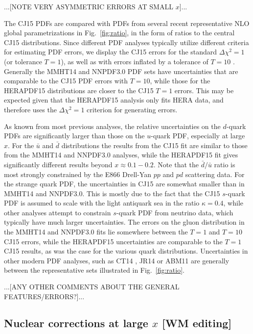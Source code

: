 \documentclass[aps,prd,amsmath,preprint]{revtex4}
\begin{document}
{\color{red} ...[NOTE VERY ASYMMETRIC ERRORS AT SMALL $x$]...}    


The CJ15 PDFs are compared with PDFs from several recent representative
NLO global parametrizations in Fig.~\ref{fig:ratio}, in the form of
ratios to the central CJ15 distributions.  Since different PDF analyses
typically utilize different criteria for estimating PDF errors, we
display the CJ15 errors for the standard $\Delta\chi^2=1$ (or tolerance
$T=1$), as well as with errors inflated by a tolerance of $T=10$
\cite{CJ12}.
Generally the MMHT14 \cite{MMHT14} and NNPDF3.0 \cite{NNPDF3.0} PDF
sets have uncertainties that are comparable to the CJ15 PDF errors with
$T=10$, while those for the HERAPDF15 \cite{HERAPDF15} distributions
are closer to the CJ15 $T=1$ errors.  This may be expected given that
the HERAPDF15 analysis only fits HERA data, and therefore uses the
$\Delta\chi^2=1$ criterion for generating errors.


As known from most previous analyses, the relative uncertainties
on the $d$-quark PDFs are significantly larger than those on the
$u$-quark PDF, especially at large $x$.
%
For the $\bar u$ and $\bar d$ distributions the results from the
CJ15 fit are similar to those from the MMHT14 and NNPDF3.0 analyses,
while the HERAPDF15 fit gives significantly different results beyond
$x \approx 0.1-0.2$.  Note that the $\bar d/\bar u$ ratio is most
strongly constrained by the E866 Drell-Yan $pp$ and $pd$ scattering
data.
%
For the strange quark PDF, the uncertainties in CJ15 are somewhat
smaller than in MMHT14 and NNPDF3.0.  This is mostly due to the
fact that the CJ15 $s$-quark PDF is assumed to scale with the
light antiquark sea in the ratio $\kappa=0.4$, while other analyses
attempt to constrain $s$-quark PDF from neutrino data, which typically
have much larger uncertainties.
%
The errors on the gluon distribution in the MMHT14 and NNPDF3.0 fits
lie somewhere between the $T=1$ and $T=10$ CJ15 errors, while the
HERAPDF15 uncertainties are comparable to the $T=1$ CJ15 results,
as was the case for the various quark distributions.
%
Uncertainties in other modern PDF analyses, such as CT14 \cite{CT14},
JR14 \cite{JR14} or ABM11 \cite{ABM11} are generally between the
representative sets illustrated in Fig.~\ref{fig:ratio}.

{\color{red} ...[ANY OTHER COMMENTS ABOUT THE GENERAL FEATURES/ERRORS?]...}


\subsection{Nuclear corrections at large $x$ {\color{red} [WM editing]}}
\label{ssec:largex}
\end{document}
